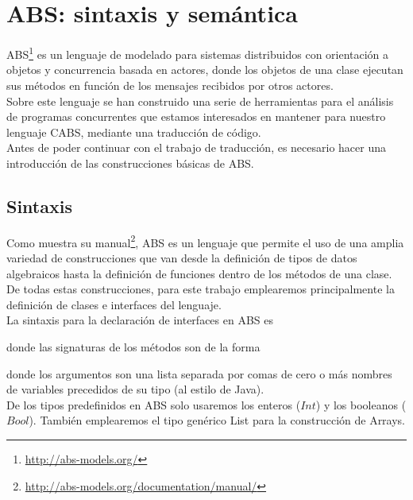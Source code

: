 \chapter{ABS: sintaxis y semántica}

ABS\footnote{\url{http://abs-models.org/}} es un lenguaje de modelado para sistemas distribuidos con orientación a objetos y concurrencia basada en actores, donde los objetos de una clase ejecutan sus métodos en función de los mensajes recibidos por otros actores.\\

Sobre este lenguaje se han construido una serie de herramientas para el análisis de programas concurrentes que estamos interesados en mantener para nuestro lenguaje CABS, mediante una traducción de código.\\

Antes de poder continuar con el trabajo de traducción, es necesario hacer una introducción de las construcciones básicas de ABS.

\section{Sintaxis}

Como muestra su manual\footnote{\url{http://abs-models.org/documentation/manual/}}, ABS es un lenguaje que permite el uso de una amplia variedad de construcciones que van desde la definición de tipos de datos algebraicos hasta la definición de funciones dentro de los métodos de una clase.\\

De todas estas construcciones, para este trabajo emplearemos principalmente la definición de clases e interfaces del lenguaje.\\

La sintaxis para la declaración de interfaces en ABS es



donde las signaturas de los métodos son de la forma



donde los argumentos son una lista separada por comas de cero o más nombres de variables precedidos de su tipo (al estilo de Java).\\

De los tipos predefinidos en ABS solo usaremos los enteros ($Int$) y los booleanos ($Bool$). También emplearemos el tipo genérico List para la construcción de Arrays.\\


